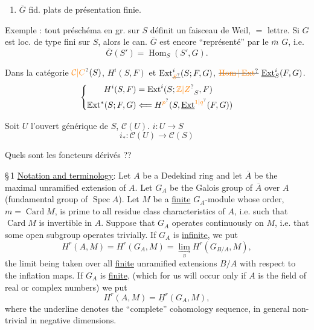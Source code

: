\begin{enumerate}[label=(\roman*),start=3]
\item $\overline G$  fid. plats de présentation finie.
\end{enumerate}

Exemple : tout préschéma en gr.  sur $S$ définit un faisceau de Weil,  $=$ lettre. Si $G$ est loc. de type fini sur $S$, alors le  can. $\overline G$ est encore ``représenté'' par le $\overline m$ $G$, i.e.
\[
\overline G(S')=\operatorname{Hom}_S(S',G).
\]


Dans la catégorie $\unsure{\mathcal C|C}(S)$, 
$H^i(S,F)$ et $\operatorname{Ext}^{i}_{\deleted{\unsure{S}}}(S;F,G)$,
$\deleted{\unsure{\operatorname{Hom}|\operatorname{Ext}}}\ \underline{\operatorname{Ext}}^i_S(F,G)$.
\[
\left\{\begin{aligned}
H^i(S,F)&=\operatorname{Ext}^i(S;\unsure{\mathbb Z|Z}_S,F)\\
\mathbb E\mathrm{xt}^{*}(S;F,G)&\Longleftarrow
 H^{\unsure{p}}(S,\underline{\operatorname{Ext}}^{\unsure{1|q}}(F,G))
\end{aligned}\right.
\]

Soit $U$ l'ouvert générique de $S$,  $\mathcal C(U)$.
 $i:U\longrightarrow S$
\[
i_*:\mathcal C(U)\longrightarrow\mathcal C(S)
\]

Quels sont les foncteurs dérivés ??


\S\,1 \uline{Notation and terminology}: Let $A$ be a Dedekind ring and let $\overline A$ be the maximal unramified extension of $A$. Let $G_A$ be the Galois group of $\overline A$ over $A$ (fundamental group of $\operatorname{Spec} A$). Let $M$ be a \uline{finite} $G_A$-module whose order, $m=\operatorname{Card} M$, is prime to all residue class characteristics of $A$, i.e. such that $\operatorname{Card} M$ is invertible in $A$. Suppose that $G_A$ operates continuously on $M$, i.e. that some open subgroup operates trivially. If $G_A$ is \uline{infinite}, we put
\[
H^r(A,M)=H^r(G_A,M)=\lim_{\underset B\longrightarrow} H^r(G_{B/A},M),
\]
the limit being taken over all \uline{finite} unramified extensions $B/A$ with respect to the inflation maps. If $G_A$ is \uline{finite}, (which for us will occur only if $A$ is the field of real or complex numbers) we put
\[
H^r(A,M)=\underline H^r(G_A,M),
\]
where the underline denotes the ``complete'' cohomology sequence, in general non-trivial in negative dimensions.

